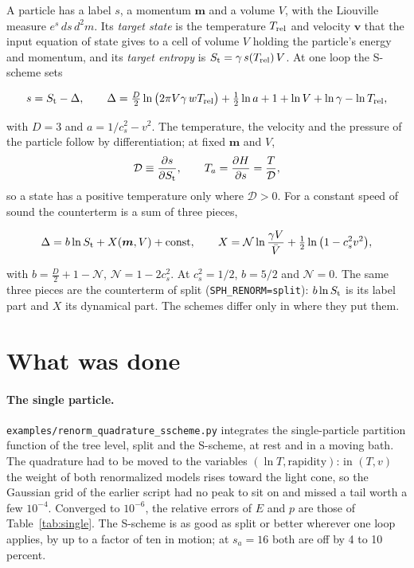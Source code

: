 \documentclass[11pt,aps,preprint,nofootinbib,superscriptaddress,tightenlines]{revtex4-2}
\def\st{\begin{equation}}
\def\stp{\end{equation}}
\def\Tab#1{Table~\ref{#1}}
\let\oldparagraph\paragraph
\renewcommand{\paragraph}{\par\bigskip\oldparagraph}
\begin{document}
A particle has a label $s$, a momentum $\bm m$ and a volume $V$, with the Liouville measure $e^s\,ds\,d^2m$.  Its \emph{target state} is the temperature
$T_{\rm rel}$ and velocity $\bm v$ that the input equation of state gives to a cell of volume $V$ holding the particle's energy and momentum, and its
\emph{target entropy} is $S_{\rm t}=\gamma\,s(T_{\rm rel})\,V$.  At one loop the S-scheme sets
\begin{keyeq}
\st
s=S_{\rm t}-\Delta,\qquad \Delta=\tfrac D2\ln\big(2\pi V\gamma\,wT_{\rm rel}\big)+\tfrac12\ln a+1+\ln V+\ln\gamma-\ln T_{\rm rel},
\label{scheme}
\stp
\end{keyeq}
with $D=3$ and $a=1/c_s^2-v^2$.  The temperature, the velocity and the pressure of the particle follow by differentiation; at fixed $\bm m$ and $V$,
\st
\mathcal D\equiv\frac{\partial s}{\partial S_{\rm t}},\qquad T_a=\frac{\partial H}{\partial s}=\frac T{\mathcal D} ,
\stp
so a state has a positive temperature only where $\mathcal D>0$.  For a constant speed of sound the counterterm is a sum of three pieces,
\begin{keyeq}
\st
\Delta=b\ln S_{\rm t}+X(\bm m,V)+\text{const},\qquad X=\mathcal N\ln\frac{\gamma V}{\bar V}+\tfrac12\ln\big(1-c_s^2v^2\big),
\label{split}
\stp
\end{keyeq}
with $b=\tfrac D2+1-\mathcal N$, $\mathcal N=1-2c_s^2$.  At $c_s^2=1/2$, $b=5/2$ and $\mathcal N=0$.  The same three pieces are the counterterm of split
(\texttt{SPH\_RENORM=split}): $b\ln S_{\rm t}$ is its label part and $X$ its dynamical part.  The schemes differ only in where they put them.

\section{What was done}
\label{sec:done}

\paragraph{The single particle.}  \nolinkurl{examples/renorm_quadrature_sscheme.py} integrates the single-particle partition function of the tree level,
split and the S-scheme, at rest and in a moving bath.  The quadrature had to be moved to the variables $(\ln T,\text{rapidity})$: in $(T,v)$ the weight
of both renormalized models rises toward the light cone, so the Gaussian grid of the earlier script had no peak to sit on and missed a tail worth a few
$10^{-4}$.  Converged to $10^{-6}$, the relative errors of $E$ and $p$ are those of \Tab{tab:single}.  The S-scheme is as good as split or better wherever
one loop applies, by up to a factor of ten in motion; at $s_a=16$ both are off by 4 to 10 percent.
\end{document}
